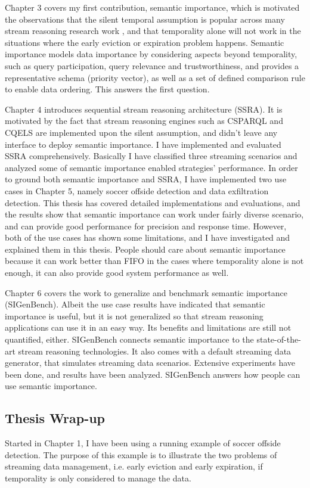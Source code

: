 Chapter 3 covers my first contribution, semantic importance, which is motivated the observations that the silent temporal assumption is popular across many stream reasoning research work \cite{barbieri2010stream} \cite{stuckenschmidt2010towards} \cite{golab2003processing} \cite{barbieri2010deductive}, and that temporality alone will not work in the situations where the early eviction or expiration problem happens. 
Semantic importance models data importance by considering aspects beyond temporality, such as query participation, query relevance and trustworthiness, and provides a representative schema (priority vector), as well as a set of defined comparison rule to enable data ordering. 
This answers the first question.

Chapter 4 introduces sequential stream reasoning architecture (SSRA). 
It is motivated by the fact that stream reasoning engines such as CSPARQL and CQELS are implemented upon the silent assumption, and didn't leave any interface to deploy semantic importance. 
I have implemented and evaluated SSRA comprehensively. 
Basically I have classified three streaming scenarios and analyzed some of semantic importance enabled strategies' performance. 
In order to ground both semantic importance and SSRA, I have implemented two use cases in Chapter 5, namely soccer offside detection and data exfiltration detection.
This thesis has covered detailed implementations and evaluations, and the results show that semantic importance can work under fairly diverse scenario, and can provide good performance for precision and response time. 
However, both of the use cases has shown some limitations, and I have investigated and explained them in this thesis. 
People should care about semantic importance because it can work better than FIFO in the cases where temporality alone is not enough, it can also provide good system performance as well. 

Chapter 6 covers the work to generalize and benchmark semantic importance (SIGenBench).
Albeit the use case results have indicated that semantic importance is useful, but it is not generalized so that stream reasoning applications can use it in an easy way.
Its benefits and limitations are still not quantified, either. 
SIGenBench connects semantic importance to the state-of-the-art stream reasoning technologies.
It also comes with a default streaming data generator, that simulates streaming data scenarios. 
Extensive experiments have been done, and results have been analyzed. 
SIGenBench answers how people can use semantic importance.
%
\subsection{Thesis Wrap-up}
Started in Chapter 1, I have been using a running example of soccer offside detection.
The purpose of this example is to illustrate the two problems of streaming data management, i.e. early eviction and early expiration, if temporality is only considered to manage the data.

